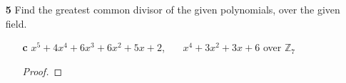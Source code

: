 \documentclass[paper=usletter, fontsize=12pt]{article}
\begin{document}
\begin{enumerate}
\begin{enumerate}
\begin{enumerate}
\begin{proof}
\begin{center}
                        \\

                    \end{center}

                    Multiplying the remainder with a non-zero constant keeps it
                    unchanged, and therefore,
                    \begin{align*}
                        \text{remainder} &= \bigg(\frac{3}{4}x^2+\frac{3}{4}x+\frac{3}{4}\bigg)\frac{4}{3}\\
                        & = x^2+x+1
                    \end{align*}
                    Thus,
                    \begin{align*}
                        \gcd(x^4+2x^3+3x^2+2x+1,4x^3+6x^2+6x+2) \\ = \gcd(4x^3+6x^2+6x+2,x^2+x+1)
                    \end{align*}
                    Dividing as before,\\
                    \begin{center}

                        \\

                    \end{center}
                    Therefore,
                    \begin{equation*}
                        \gcd(x^4+2x^3+3x^2+2x+1,4x^3+6x^2+6x+2) = x^2+x+1 \qedhere
                    \end{equation*}

                \end{proof}

            \end{enumerate}

            \item[\textbf{5}] Find the greatest common divisor of the given
            polynomials, over the given field.
            \begin{enumerate}

                \item[\textbf{c}] $x^5+4x^4+6x^3+6x^2+5x+2$, \ \ \
                $x^4+3x^2+3x+6$ over $\mathbb{Z}_7$
                \begin{proof}


\end{proof}
\end{enumerate}
\end{enumerate}
\end{enumerate}
\end{document}

